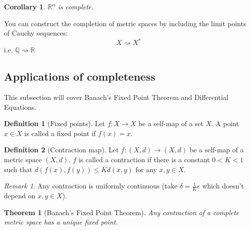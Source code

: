 \documentclass{article}
\theoremstyle{definition}
\newtheorem{defn}{Definition}[section]
\theoremstyle{plain}%
\newtheorem{thm}{Theorem}[section]
\newtheorem*{cor}{Corollary}
\theoremstyle{remark}
\newtheorem*{rem}{Remark}
\newcommand{\R}{\mathbb{R}}
\newcommand{\Q}{\mathbb{Q}}
\begin{document}
\begin{cor}
    $\R^n$ is complete.
\end{cor}

You can construct the completion of metric spaces by including the limit points of Cauchy sequences:
\[X \rightsquigarrow X^*\]
i.e. $\Q \rightsquigarrow \R$

\subsection{Applications of completeness}

This subsection will cover Banach's Fixed Point Theorem and Differential Equations.

\begin{defn}[Fixed points]
    Let $f : X \to X$ be a self-map of a set $X$. A point $x \in X$ is called a fixed point if $f(x) = x$.
\end{defn}

\begin{defn}[Contraction map]
    Let $f: (X,d) \to (X,d)$ be a self-map of a metric space $(X,d)$. $f$ is called a contraction if there is a constant $0 < K < 1$ such that $d(f(x), f(y)) \le Kd(x,y)$ for any $x, y \in X$.
\end{defn}

\begin{rem}
   Any contraction is uniformly continuous (take $\delta = \frac{1}{K} \epsilon$ which doesn't depend on $x, y \in X$).
\end{rem}

\begin{thm}[Banach's Fixed Point Theorem]
    Any contraction of a complete metric space has a unique fixed point.
\end{thm}
\end{document}
